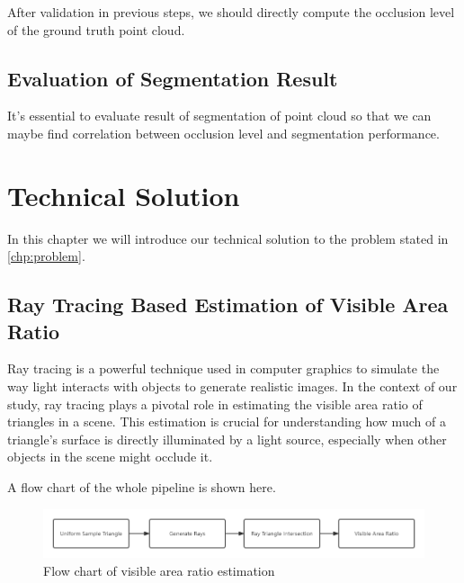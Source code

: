 \documentclass[11pt, a4paper,oneside,chapterprefix=false]{scrbook}
\begin{document}
After validation in previous steps, we should directly compute the occlusion level of the ground truth point cloud.

\section{Evaluation of Segmentation Result} \label{sec:evaluation}

It's essential to evaluate result of segmentation of point cloud so that we can maybe find correlation between occlusion level and segmentation performance.

\chapter{Technical Solution} \label{chp:solution}

In this chapter we will introduce our technical solution to the problem stated in \ref{chp:problem}.


\section{Ray Tracing Based Estimation of Visible Area Ratio} \label{sec:ray tracing visible area ratio}

Ray tracing is a powerful technique used in computer graphics to simulate the way light interacts with objects to generate realistic images. In the context of our study, ray tracing plays a pivotal role in estimating the visible area ratio of triangles in a scene. This estimation is crucial for understanding how much of a triangle's surface is directly illuminated by a light source, especially when other objects in the scene might occlude it.

\vspace{10pt}

A flow chart of the whole pipeline is shown here.

\begin{minipage}{\textwidth}
	\begin{figure}[H]
		\centering
		\includegraphics*[width=1.0\textwidth]{figures/visible area.png}
		\caption{Flow chart of visible area ratio estimation}
		\label{fig:visible area ratio estimation}
	\end{figure}
\end{minipage}
\end{document}
